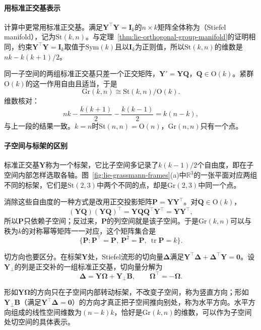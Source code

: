 \paragraph{用标准正交基表示}
计算中更常用标准正交基。满足$\bm Y^\top\bm Y=\bm I_k$的$n\times k$矩阵全体称为（Stiefel manifold），记为$\mathrm{St}(k,n)$。与定理~\ref{thm:lie-orthogonal-group-manifold}的证明相同，约束$\bm Y^\top\bm Y=\bm I_k$取值于$\mathrm{Sym}(k)$且以$\bm I_k$为正则值，所以$\mathrm{St}(k,n)$的维数是$nk-k(k+1)/2$。

同一子空间的两组标准正交基只差一个正交矩阵，$\bm Y'=\bm Y\bm Q$，$\bm Q\in\mathrm O(k)$。紧群$\mathrm O(k)$的这一作用自由且适当，于是
\begin{equation}
 \mathrm{Gr}(k,n)\cong\mathrm{St}(k,n)/\mathrm O(k).
 \label{eq:lie-grassmann-stiefel}
\end{equation}
维数核对：
\[
nk-\frac{k(k+1)}2-\frac{k(k-1)}2=k(n-k),
\]
与上一段的结果一致。$k=n$时$\mathrm{St}(n,n)=\mathrm O(n)$，$\mathrm{Gr}(n,n)$只有一个点。

\paragraph{子空间与标架的区别}
标准正交基$\bm Y$称为一个标架，它比子空间多记录了$k(k-1)/2$个自由度，即在子空间内部怎样选取各轴。图~\ref{fig:lie-grassmann-frames}(a)中$\mathbb R^3$的一张平面对应两组不同的标架，它们是$\mathrm{St}(2,3)$中两个不同的点，却是$\mathrm{Gr}(2,3)$中同一个点。

消除这些自由度的一种方式是改用正交投影矩阵$\bm P=\bm Y\bm Y^\top$。对$\bm Q\in\mathrm O(k)$，
\[
(\bm Y\bm Q)(\bm Y\bm Q)^\top=\bm Y\bm Q\bm Q^\top\bm Y^\top=\bm Y\bm Y^\top,
\]
所以$\bm P$只依赖子空间；反过来，$\bm P$的列空间就是该子空间。于是$\mathrm{Gr}(k,n)$可以与秩为$k$的对称幂等矩阵一一对应，这个矩阵集合是
\[
\{\bm P:\bm P^\top=\bm P,\ \bm P^2=\bm P,\ \operatorname{tr}\bm P=k\}.
\]

切方向也要区分。在标架$\bm Y$处，Stiefel流形的切向量$\bm\Delta$满足$\bm Y^\top\bm\Delta+\bm\Delta^\top\bm Y=\bm0$。设$\bm Y_\perp$的列是正交补的一组标准正交基，切向量分解为
\[
\bm\Delta=\bm Y\bm\Omega+\bm Y_\perp\bm B,\qquad \bm\Omega^\top=-\bm\Omega .
\]

形如$\bm Y\bm\Omega$的方向只在子空间内部转动标架，不改变子空间，称为竖直方向；形如$\bm Y_\perp\bm B$（满足$\bm Y^\top\bm\Delta=\bm0$）的方向才真正把子空间推向别处，称为水平方向。水平方向组成的线性空间维数为$(n-k)k$，恰好是$\mathrm{Gr}(k,n)$的维数，可以作为子空间处切空间的具体表示。


